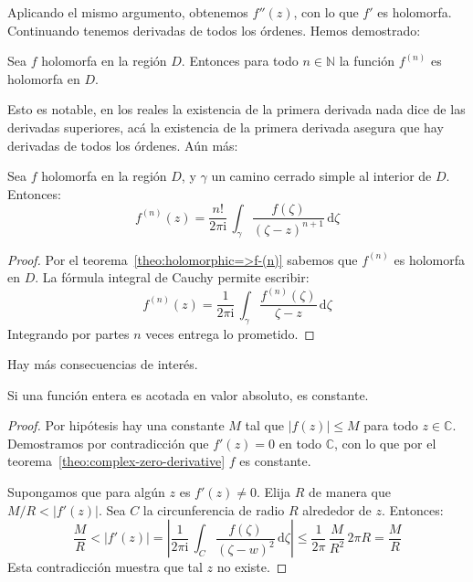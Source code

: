   Aplicando el mismo argumento,
  obtenemos \(f''(z)\),
  con lo que \(f'\) es holomorfa.%
  Continuando tenemos derivadas de todos los órdenes.
  Hemos demostrado:
  \begin{theorem}
    \label{theo:holomorphic=>f-(n)}
    Sea \(f\) holomorfa en la región \(D\).
    Entonces para todo \(n \in \mathbb{N}\)
    la función \(f^{(n)}\) es holomorfa en \(D\).
  \end{theorem}
  Esto es notable,
  en los reales la existencia de la primera derivada
  nada dice de las derivadas superiores,
  acá la existencia de la primera derivada
  asegura que hay derivadas de todos los órdenes.
  Aún más:
  \begin{theorem}
    \label{theo:Cauchy-formula-f-(n)}
    Sea \(f\) holomorfa en la región \(D\),
    y \(\gamma\) un camino cerrado simple al interior de \(D\).
    Entonces:
    \begin{equation}
      \label{eq:Cauchy-formula-f-(n)}
      f^{(n)}(z)
	= \frac{n!}{2 \pi \mathrm{i}} \,
	    \int_\gamma \frac{f(\zeta)}{(\zeta - z)^{n + 1}}
	      \, \mathrm{d} \zeta
    \end{equation}
  \end{theorem}
  \begin{proof}
    Por el teorema~\ref{theo:holomorphic=>f-(n)}
    sabemos que \(f^{(n)}\)
    es holomorfa en \(D\).
    La fórmula integral de Cauchy permite escribir:%
    \begin{equation*}
      f^{(n)}(z)
	= \frac{1}{2 \pi \mathrm{i}} \,
	    \int_\gamma \frac{f^{(n)}(\zeta)}{\zeta - z}
	      \, \mathrm{d} \zeta
    \end{equation*}
    Integrando por partes \(n\) veces entrega lo prometido.
  \end{proof}
  Hay más consecuencias de interés.
  \begin{theorem}[Liouville]
    \label{theo:Liouville}
    Si una función entera es acotada en valor absoluto,
    es constante.
  \end{theorem}
  \begin{proof}
    Por hipótesis hay una constante \(M\)
    tal que \(\lvert f(z) \rvert  \le M\)
    para todo \(z \in \mathbb{C}\).
    Demostramos por contradicción
    que \(f'(z) = 0\) en todo \(\mathbb{C}\),
    con lo que por el teorema~\ref{theo:complex-zero-derivative}
    \(f\) es constante.

    Supongamos que para algún \(z\) es \(f'(z) \ne 0\).
    Elija \(R\) de manera que \(M / R < \lvert f'(z) \rvert\).
    Sea \(C\) la circunferencia de radio \(R\) alrededor de \(z\).
    Entonces:
    \begin{equation*}
      \frac{M}{R}
	<   \lvert f'(z) \rvert
	=   \left\lvert
	      \frac{1}{2 \pi \mathrm{i}} \,
		\int_C \frac{f(\zeta)}{(\zeta - w)^2}
		  \, \mathrm{d} \zeta
	    \right\rvert
	\le \frac{1}{2 \pi} \, \frac{M}{R^2} \, 2 \pi R
	= \frac{M}{R}
    \end{equation*}
    Esta contradicción muestra que tal \(z\) no existe.
  \end{proof}
